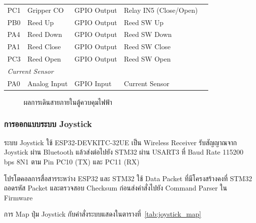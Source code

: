 \begin{table}[H]
\begin{tabular}{lllll}
    PC1 & Gripper CO & GPIO Output      & Relay IN5 (Close/Open) \\
    PB0 & Reed Up    & GPIO Output      & Reed SW Up \\
    PA4 & Reed Down  & GPIO Output      & Reed SW Down \\
    PA1 & Reed Close & GPIO Output      & Reed SW Close \\
    PC3 & Reed Open  & GPIO Output      & Reed SW Open \\
    \midrule
    \multicolumn{4}{l}{\textit{Current Sensor}} \\
    PA0 & Analog Input & GPIO Input      & Current Sensor \\
    \bottomrule
  \end{tabular}
\end{table}

\begin{figure}[H]
  \centering
  \caption{ผลการเดินสายภายในตู้ควบคุมไฟฟ้า}
  \label{fig:cabinet_wiring}
\end{figure}

\subsubsection{การออกแบบระบบ Joystick}
\label{subsubsec:joystick_system_design}

ระบบ Joystick ใช้ ESP32-DEVKITC-32UE เป็น Wireless Receiver
รับสัญญาณจาก Joystick ผ่าน Bluetooth แล้วส่งต่อไปยัง STM32
ผ่าน USART3 ที่ Baud Rate 115200\,bps 8N1
ตาม Pin PC10 (TX) และ PC11 (RX)

โปรโตคอลการสื่อสารระหว่าง ESP32 และ STM32
ใช้ Data Packet ที่มีโครงสร้างคงที่
STM32 ถอดรหัส Packet และตรวจสอบ Checksum
ก่อนส่งคำสั่งไปยัง Command Parser ใน Firmware

การ Map ปุ่ม Joystick กับคำสั่งระบบแสดงในตารางที่~\ref{tab:joystick_map}


